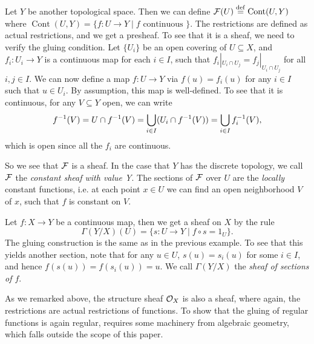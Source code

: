 \documentclass{article}
\DeclareMathOperator{\Cont}{Cont}
\begin{document}
\begin{example}
    Let $Y$ be another topological space. Then we can define $\mcF(U) \defeq \Cont(U, Y)$
    where $\Cont(U,Y) = \{f\colon U \to Y \mid f \text{ continuous }\}$.
    The restrictions are defined as actual restrictions, and we get a presheaf. To see that
    it is a sheaf, we need to verify the gluing condition.
    Let $\{U_i\}$ be an open covering of $U\subseteq X$,
    and $f_i \colon U_i \to Y$ is a continuous map for each $i\in I$,
    such that $f_i|_{U_i \cap U_j} = f_j |_{U_i \cap U_j}$ for all $i,j\in I$.
    We can now define a map $f\colon U \to Y$ via $f(u) = f_i(u)$ for any $i\in I$
    such that $u\in U_i$. By assumption, this map is well-defined.
    To see that it is continuous, for any $V\subseteq Y$ open,
    we can write
    \begin{equation*}
        f^{-1}(V) = U \cap f^{-1}(V)=
        \bigcup_{i\in I} (U_i \cap f^{-1}(V)) =
        \bigcup_{i\in I}f_i^{-1}(V),
    \end{equation*}
    which is open since all the $f_i$ are continuous.

    So we see that $\mathcal{F}$ is a sheaf.
    In the case that $Y$ has the discrete topology,
    we call $\mathcal{F}$ the \emph{constant sheaf with value Y}.
    The sections of $\mathcal{F}$ over $U$ are the \emph{locally} constant functions,
    i.e. at each point $x\in U$ we can find an open neighborhood $V$ of $x$,
    such that $f$ is constant on $V$.
\end{example}
\begin{example}

    Let $f\colon X\to Y$ be a continuous map, then we get a sheaf
    on $X$ by the rule
    \begin{equation*}
        \Gamma(Y/X)(U) = \{s\colon U\to Y \mid f\circ s = 1_{U}\}.
    \end{equation*}
    The gluing construction is the same as in the previous example.
    To see that this yields another section, note that for
    any $u \in U$, $s(u) = s_i(u)$ for some $i\in I$, and hence
    $f(s(u)) = f(s_i(u)) = u$.
    We call $\Gamma(Y/X)$ the \emph{sheaf of sections of $f$}.
\end{example}
\begin{example}
    As we remarked above, the structure sheaf $\mathcal{O}_X$ is also a sheaf,
    where again, the restrictions are actual restrictions of functions.
    To show that the gluing of regular functions is again regular,
    requires some machinery from algebraic geometry, which falls outside
    the scope of this paper.
\end{example}
\end{document}
